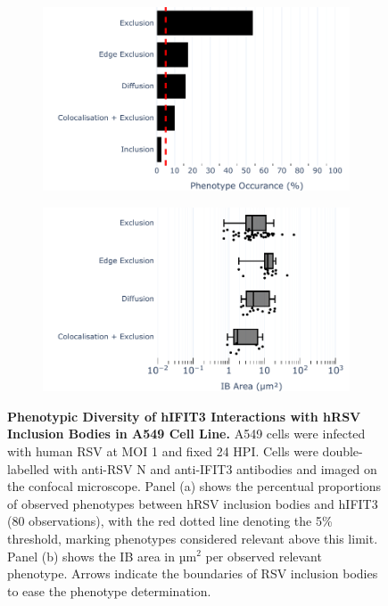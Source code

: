 \begin{figure}
    \begin{subfigure}{0.495\textwidth}
        \caption{}
        \includegraphics[width=1\linewidth]{08. Chapter 3/Figs/02. Infection/03. IFIT3/01. bar_i3_a549.pdf} 
    \end{subfigure}
    \begin{subfigure}{0.495\textwidth}
        \caption{}
        \includegraphics[width=1\linewidth]{08. Chapter 3/Figs/02. Infection/03. IFIT3/02. box_i3_a549.pdf}
    \end{subfigure}
    \caption[Phenotypic Diversity of hIFIT3 Interactions with hRSV Inclusion Bodies in A549 Cell Line.]{\textbf{Phenotypic Diversity of hIFIT3 Interactions with hRSV Inclusion Bodies in A549 Cell Line.} A549 cells were infected with human RSV at MOI 1 and fixed 24 HPI. Cells were double-labelled with anti-RSV N and anti-IFIT3 antibodies and imaged on the confocal microscope. Panel (a) shows the percentual proportions of observed phenotypes between hRSV inclusion bodies and hIFIT3 (80 observations), with the red dotted line denoting the 5\% threshold, marking phenotypes considered relevant above this limit. Panel (b) shows the IB area in \(\mbox{µm}^2\) per observed relevant phenotype.  Arrows indicate the boundaries of RSV inclusion bodies to ease the phenotype determination.}
    \label{fig:Phenotypic Diversity of hIFIT3 Interactions with hRSV Inclusion Bodies in A549 Cell Line}
\end{figure}

